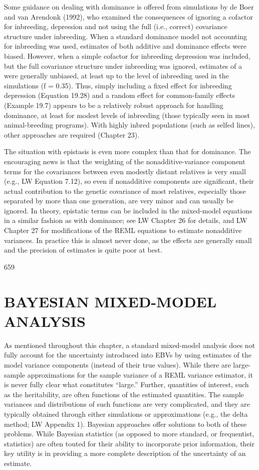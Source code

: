 \documentclass{article}
\begin{document}
Some guidance on dealing with dominance is offered from simulations by de Boer and van Arendonk (1992), who examined the consequences of ignoring a cofactor for inbreeding, depression and not using the full (i.e., correct) covariance structure under inbreeding. When a standard dominance model not accounting for inbreeding was used, estimates of both additive and dominance effects were biased. However, when a simple cofactor for inbreeding depression was included, but the full covariance structure under inbreeding was ignored, estimates of a were generally unbiased, at least up to the level of inbreeding used in the simulations (f = 0.35). Thus, simply including a fixed effect for inbreeding depression (Equation 19.28) and a random effect for common-family effects (Example 19.7) appears to be a relatively robust approach for handling dominance, at least for modest levels of inbreeding (those typically seen in most animal-breeding programs). With highly inbred populations (such as selfed lines), other approaches are required (Chapter 23).

The situation with epistasis is even more complex than that for dominance. The encouraging news is that the weighting of the nonadditive-variance component terms for the covariances between even modestly distant relatives is very small (e.g., LW Equation 7.12), so even if nonadditive components are significant, their actual contribution to the genetic covariance of most relatives, especially those separated by more than one generation, are very minor and can usually be ignored. In theory, epistatic terms can be included in the mixed-model equations in a similar fashion as with dominance; see LW Chapter 26 for details, and LW Chapter 27 for modifications of the REML equations to estimate nonadditive variances. In practice this is almost never done, as the effects are generally small and the precision of estimates is quite poor at best.

659

\section{BAYESIAN MIXED-MODEL ANALYSIS}
As mentioned throughout this chapter, a standard mixed-model analysis does not fully account for the uncertainty introduced into EBVs by using estimates of the model variance components (instead of their true values). While there are large-sample approximations for the sample variance of a REML variance estimator, it is never fully clear what constitutes “large.” Further, quantities of interest, such as the heritability, are often functions of the estimated quantities. The sample variances and distributions of such functions are very complicated, and they are typically obtained through either simulations or approximations (e.g., the delta method; LW Appendix 1). Bayesian approaches offer solutions to both of these problems. While Bayesian statistics (as opposed to more standard, or frequentist, statistics) are often touted for their ability to incorporate prior information, their key utility is in providing a more complete description of the uncertainty of an estimate.
\end{document}
